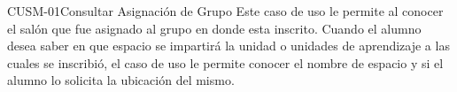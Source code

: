\begin{UseCase}{CUSM-01}{Consultar Asignación de Grupo}
    {
	Este caso de uso le permite al  conocer el salón que fue asignado al grupo en donde esta inscrito.
	Cuando el alumno desea saber en que espacio se impartirá la unidad o unidades de aprendizaje a las cuales se inscribió, el caso de uso le permite conocer el nombre de espacio y si el alumno lo solicita la ubicación del mismo.
    }


%			


\end{UseCase}
